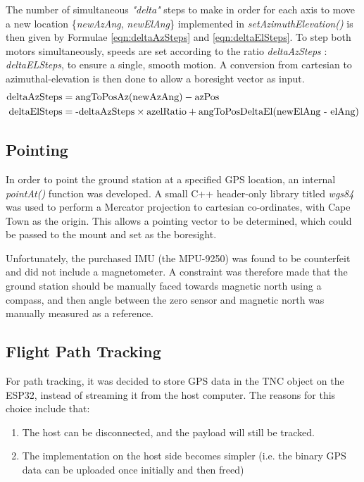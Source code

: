 \noindent The number of simultaneous \textit{"delta"} steps to make in order for each axis to move a new location \{\textit{newAzAng}, \textit{newElAng}\} implemented in \textit{setAzimuthElevation()} is then given by Formulae \ref{eqn:deltaAzSteps} and \ref{eqn:deltaElSteps}. To step both motors simultaneously, speeds are set according to the ratio \textit{deltaAzSteps} : \textit{deltaELSteps}, to ensure a single, smooth motion. A conversion from cartesian to azimuthal-elevation is then done to allow a boresight vector as input.
\begin{align}
    \textnormal{deltaAzSteps} &= \textnormal{angToPosAz(newAzAng)} - \textnormal{azPos} \label{eqn:deltaAzSteps} \\ 
    \textnormal{deltaElSteps} &= \textnormal{-deltaAzSteps} \times \textnormal{azelRatio} + \textnormal {angToPosDeltaEl(newElAng - elAng)}\label{eqn:deltaElSteps} 
\end{align}

\subsection{Pointing}
In order to point the ground station at a specified GPS location, an internal \textit{pointAt()} function was developed. A small C++ header-only library titled \textit{wgs84} was used to perform a Mercator projection to cartesian co-ordinates, with Cape Town as the origin. This allows a pointing vector to be determined, which could be passed to the mount and set as the boresight.

Unfortunately, the purchased IMU (the MPU-9250) was found to be counterfeit and did not include a magnetometer. A constraint was therefore made that the ground station should be manually faced towards magnetic north using a compass, and then angle between the zero sensor and magnetic north was manually measured as a reference.

\subsection{Flight Path Tracking}
For path tracking, it was decided to store GPS data in the TNC object on the ESP32, instead of streaming it from the host computer. The reasons for this choice include that:
\begin{enumerate}
  \item The host can be disconnected, and the payload will still be tracked.
  \item The implementation on the host side becomes simpler (i.e. the binary GPS data can be uploaded once initially and then freed)
\end{enumerate}

